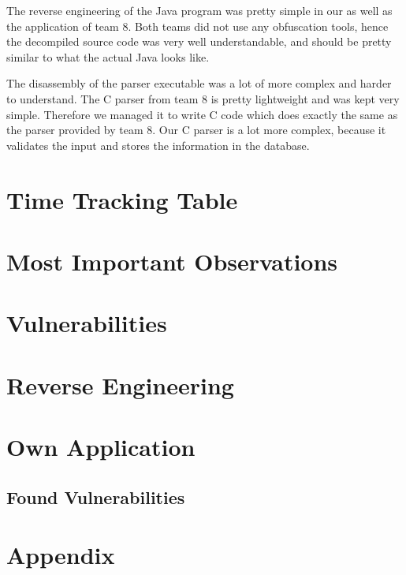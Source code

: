 \documentclass{report}
\begin{document}
The reverse engineering of the Java program was pretty simple in our as well as the application of team 8. Both teams did not use any obfuscation tools, hence the decompiled source code was very well understandable, and should be pretty similar to what the actual Java looks like.

The disassembly of the parser executable was a lot of more complex and harder to understand. The C parser from team 8 is pretty lightweight and was kept very simple. Therefore we managed it to write C code which does exactly the same as the parser provided by team 8. Our C parser is a lot more complex, because it validates the input and stores the information in the database.


\tableofcontents

\part{Time Tracking Table}


\part{Most Important Observations}


\part{Vulnerabilities}





\part{Reverse Engineering}



\part{Own Application}


\chapter{Found Vulnerabilities}








\part*{Appendix}
\appendix

\end{document}
